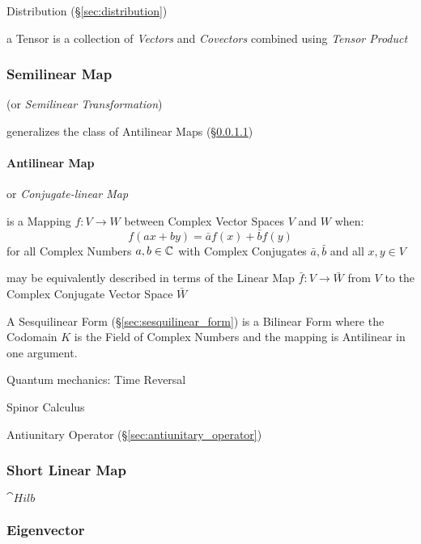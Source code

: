Distribution (\S\ref{sec:distribution})

\fist a Tensor is a collection of \emph{Vectors} and \emph{Covectors} combined
using \emph{Tensor Product}



\subsubsection{Semilinear Map}\label{sec:semilinear_map}

(or \emph{Semilinear Transformation})

generalizes the class of Antilinear Maps (\S\ref{sec:antilinear_map})



\paragraph{Antilinear Map}\label{sec:antilinear_map}\hfill

or \emph{Conjugate-linear Map}

is a Mapping $f : V \rightarrow W$ between Complex Vector Spaces $V$ and $W$
when:
\[
  f (ax+by) = \bar{a}f(x) + \bar{b}f(y)
\]
for all Complex Numbers $a,b \in \mathbb{C}$ with Complex Conjugates $\bar{a},
\bar{b}$ and all $x,y \in V$

may be equivalently described in terms of the Linear Map $\bar{f} : V
\rightarrow \bar{W}$ from $V$ to the Complex Conjugate Vector Space $\bar{W}$

A Sesquilinear Form (\S\ref{sec:sesquilinear_form}) is a Bilinear Form where
the Codomain $K$ is the Field of Complex Numbers and the mapping is Antilinear
in one argument.


Quantum mechanics: Time Reversal

Spinor Calculus

\fist Antiunitary Operator (\S\ref{sec:antiunitary_operator})



\subsubsection{Short Linear Map}\label{sec:short_linear}

$\cat{Hilb}$



\subsubsection{Eigenvector}\label{sec:eigenvector}

